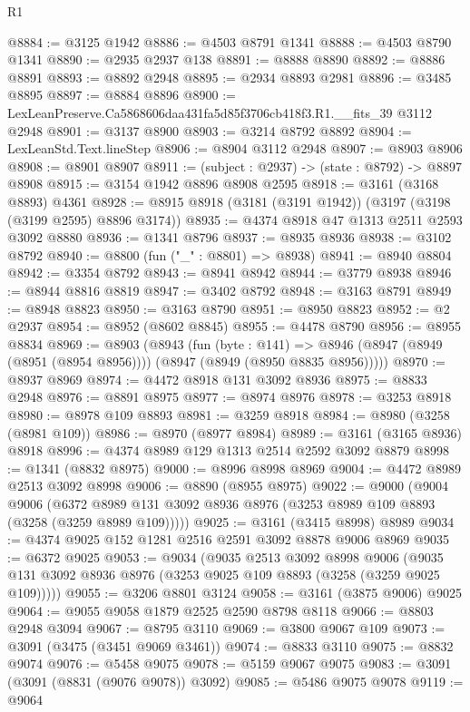 \begin{lexlean}{R1}
\begin{coremodule}
@8884 := @3125 @1942
@8886 := @4503 @8791 @1341
@8888 := @4503 @8790 @1341
@8890 := @2935 @2937 @138
@8891 := @8888 @8890
@8892 := @8886 @8891
@8893 := @8892 @2948
@8895 := @2934 @8893 @2981
@8896 := @3485 @8895
@8897 := @8884 @8896
@8900 := LexLeanPreserve.Ca5868606daa431fa5d85f3706cb418f3.R1.__fits_39 @3112 @2948
@8901 := @3137 @8900
@8903 := @3214 @8792 @8892
@8904 := LexLeanStd.Text.lineStep
@8906 := @8904 @3112 @2948
@8907 := @8903 @8906
@8908 := @8901 @8907
@8911 := (subject : @2937) -> (state : @8792) -> @8897 @8908
@8915 := @3154 @1942 @8896 @8908 @2595
@8918 := @3161 (@3168 @8893) @4361
@8928 := @8915 @8918 (@3181 (@3191 @1942)) (@3197 (@3198 (@3199 @2595) @8896 @3174))
@8935 := @4374 @8918 @47 @1313 @2511 @2593 @3092 @8880
@8936 := @1341 @8796
@8937 := @8935 @8936
@8938 := @3102 @8792
@8940 := @8800 (fun ("_" : @8801) => @8938)
@8941 := @8940 @8804
@8942 := @3354 @8792
@8943 := @8941 @8942
@8944 := @3779 @8938
@8946 := @8944 @8816 @8819
@8947 := @3402 @8792
@8948 := @3163 @8791
@8949 := @8948 @8823
@8950 := @3163 @8790
@8951 := @8950 @8823
@8952 := @2 @2937
@8954 := @8952 (@8602 @8845)
@8955 := @4478 @8790
@8956 := @8955 @8834
@8969 := @8903
    (@8943
      (fun (byte : @141) =>
      @8946 (@8947 (@8949 (@8951 (@8954 @8956)))) (@8947 (@8949 (@8950 @8835 @8956)))))
@8970 := @8937 @8969
@8974 := @4472 @8918 @131 @3092 @8936
@8975 := @8833 @2948
@8976 := @8891 @8975
@8977 := @8974 @8976
@8978 := @3253 @8918
@8980 := @8978 @109 @8893
@8981 := @3259 @8918
@8984 := @8980 (@3258 (@8981 @109))
@8986 := @8970 (@8977 @8984)
@8989 := @3161 (@3165 @8936) @8918
@8996 := @4374 @8989 @129 @1313 @2514 @2592 @3092 @8879
@8998 := @1341 (@8832 @8975)
@9000 := @8996 @8998 @8969
@9004 := @4472 @8989 @2513 @3092 @8998
@9006 := @8890 (@8955 @8975)
@9022 := @9000
    (@9004
      @9006
      (@6372 @8989 @131 @3092 @8936 @8976 (@3253 @8989 @109 @8893 (@3258 (@3259 @8989 @109)))))
@9025 := @3161 (@3415 @8998) @8989
@9034 := @4374 @9025 @152 @1281 @2516 @2591 @3092 @8878 @9006 @8969
@9035 := @6372 @9025
@9053 := @9034
    (@9035
      @2513
      @3092
      @8998
      @9006
      (@9035 @131 @3092 @8936 @8976 (@3253 @9025 @109 @8893 (@3258 (@3259 @9025 @109)))))
@9055 := @3206 @8801 @3124
@9058 := @3161 (@3875 @9006) @9025
@9064 := @9055 @9058 @1879 @2525 @2590 @8798 @8118
@9066 := @8803 @2948 @3094
@9067 := @8795 @3110
@9069 := @3800 @9067 @109
@9073 := @3091 (@3475 (@3451 @9069 @3461))
@9074 := @8833 @3110
@9075 := @8832 @9074
@9076 := @5458 @9075
@9078 := @5159 @9067 @9075
@9083 := @3091 (@3091 (@8831 (@9076 @9078)) @3092)
@9085 := @5486 @9075 @9078
@9119 := @9064

\end{coremodule}
\end{lexlean}
